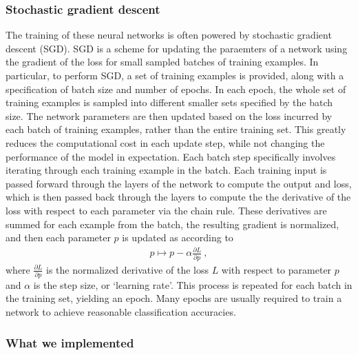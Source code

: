 \subsubsection{Stochastic gradient descent}
The training of these neural networks is often powered by stochastic gradient descent (SGD).
SGD is a scheme for updating the paraemters of a network using the gradient of the loss for small sampled batches of training examples.
In particular, to perform SGD, a set of training examples is provided, along with a specification of batch size and number of epochs.
In each epoch, the whole set of training examples is sampled into different smaller sets specified by the batch size.
The network parameters are then updated based on the loss incurred by each batch of training examples, rather than the entire training set.
This greatly reduces the computational cost in each update step, while not changing the performance of the model in expectation.
Each batch step specifically involves iterating through each training example in the batch.
Each training input is passed forward through the layers of the network to compute the output and loss, which is then passed back through the layers to compute the the derivative of the loss with respect to each parameter via the chain rule.
These derivatives are summed for each example from the batch, the resulting gradient is normalized, and then each parameter $p$ is updated as according to
\begin{equation*}
  \begin{aligned}
    p \mapsto p - \alpha\frac{\partial L}{\partial p} ~,
  \end{aligned}
\end{equation*}
where $\frac{\partial L}{\partial p}$ is the normalized derivative of the loss $L$ with respect to parameter $p$ and $\alpha$ is the step size, or `learning rate'.
This process is repeated for each batch in the training set, yielding an epoch.
Many epochs are usually required to train a network to achieve reasonable classification accuracies.

\subsubsection{What we implemented}









